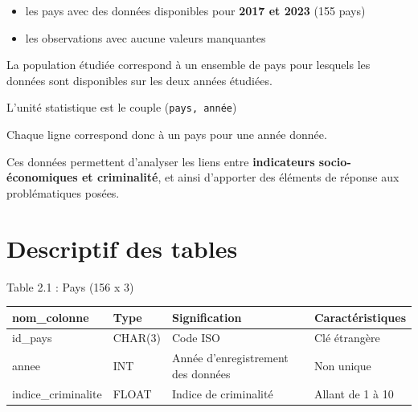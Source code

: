 \documentclass[mstat,12pt]{unswthesis}
\begin{document}
\begin{itemize}
\item
  les pays avec des données disponibles pour \textbf{2017 et 2023} (155
  pays)
\item
  les observations avec aucune valeurs manquantes
\end{itemize}

\bigskip

La population étudiée correspond à un ensemble de pays pour lesquels les
données sont disponibles sur les deux années étudiées.

L'unité statistique est le couple (\texttt{pays,\ année})

Chaque ligne correspond donc à un pays pour une année donnée.

Ces données permettent d'analyser les liens entre \textbf{indicateurs
socio-économiques et criminalité}, et ainsi d'apporter des éléments de
réponse aux problématiques posées.

\section{Descriptif des tables}\label{descriptif-des-tables}

Table 2.1 : Pays (156 x 3)

\begin{longtable}[]{@{}
  >{\raggedright\arraybackslash}p{}
  >{\raggedright\arraybackslash}p{}
  >{\raggedright\arraybackslash}p{}
  >{\raggedright\arraybackslash}p{}@{}}
\toprule\noalign{}
\begin{minipage}[b]{\linewidth}\raggedright
nom\_colonne
\end{minipage} & \begin{minipage}[b]{\linewidth}\raggedright
Type
\end{minipage} & \begin{minipage}[b]{\linewidth}\raggedright
Signification
\end{minipage} & \begin{minipage}[b]{\linewidth}\raggedright
Caractéristiques
\end{minipage} \\
\midrule\noalign{}
\endhead
\bottomrule\noalign{}
\endlastfoot
id\_pays & CHAR(3) & Code ISO & Clé étrangère \\
annee & INT & Année d'enregistrement des données & Non unique \\
indice\_criminalite & FLOAT & Indice de criminalité & Allant de 1 à
10 \\
\end{longtable}
\end{document}
